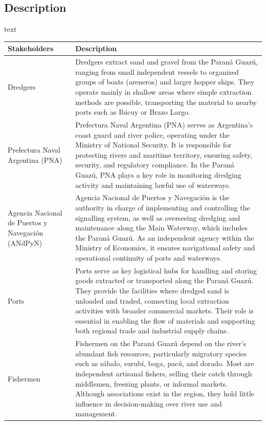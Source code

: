 \subsection{Description}
text

\begin{table}[H]
\centering
\begin{tabularx}{\linewidth}{p{3.5cm}X} %
\toprule
\textbf{Stakeholders} & \textbf{Description} \\
\midrule
Dredgers & Dredgers extract sand and gravel from the Paraná Guazú, ranging from small independent vessels to organized groups of boats (areneros) and larger hopper ships. They operate mainly in shallow areas where simple extraction methods are possible, transporting the material to nearby ports such as Ibicuy or Brazo Largo. \\
\midrule
Prefectura Naval Argentina (PNA) & Prefectura Naval Argentina (PNA) serves as Argentina’s coast guard and river police, operating under the Ministry of National Security. It is responsible for protecting rivers and maritime territory, ensuring safety, security, and regulatory compliance. In the Paraná Guazú, PNA plays a key role in monitoring dredging activity and maintaining lawful use of waterways. \\
\midrule
Agencia Nacional de Puertos y Navegación (ANdPyN) & Agencia Nacional de Puertos y Navegación is the authority in charge of implementing and controlling the signalling system, as well as overseeing dredging and maintenance along the Main Waterway, which includes the Paraná Guazú. As an independent agency within the Ministry of Economics, it ensures navigational safety and operational continuity of ports and waterways. \\
\midrule
Ports & Ports serve as key logistical hubs for handling and storing goods extracted or transported along the Paraná Guazú. They provide the facilities where dredged sand is unloaded and traded, connecting local extraction activities with broader commercial markets. Their role is essential in enabling the flow of materials and supporting both regional trade and industrial supply chains. \\
\midrule
Fishermen & Fishermen on the Paraná Guazú depend on the river’s abundant fish resources, particularly migratory species such as sábalo, surubí, boga, pacú, and dorado. Most are independent artisanal fishers, selling their catch through middlemen, freezing plants, or informal markets. Although associations exist in the region, they hold little influence in decision-making over river use and management. \\

\end{tabularx}
\end{table}

